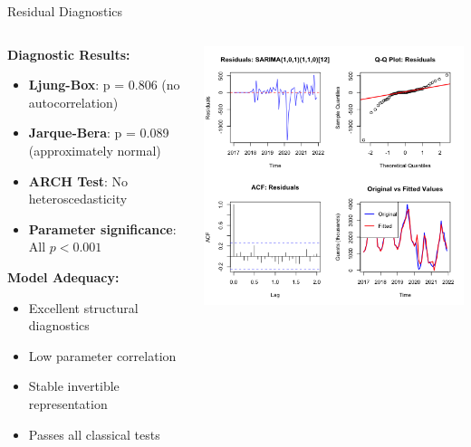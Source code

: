\documentclass[10pt]{beamer}
\begin{document}
\begin{frame}{Residual Diagnostics}
\begin{columns}
\begin{column}{0.45\textwidth}
\textbf{Diagnostic Results:}
\begin{itemize}
\item \textbf{Ljung-Box}: p = 0.806 (no autocorrelation)
\item \textbf{Jarque-Bera}: p = 0.089 (approximately normal)
\item \textbf{ARCH Test}: No heteroscedasticity
\item \textbf{Parameter significance}: All $p < 0.001$
\end{itemize}

\vspace{0.3cm}
\textbf{Model Adequacy:}
\begin{itemize}
\item Excellent structural diagnostics
\item Low parameter correlation
\item Stable invertible representation
\item Passes all classical tests
\end{itemize}
\end{column}

\begin{column}{0.55\textwidth}
\includegraphics[width=\textwidth,height=0.85\textheight,keepaspectratio]{plots/residuals.png}
\end{column}
\end{columns}
\end{frame}
\end{document}
